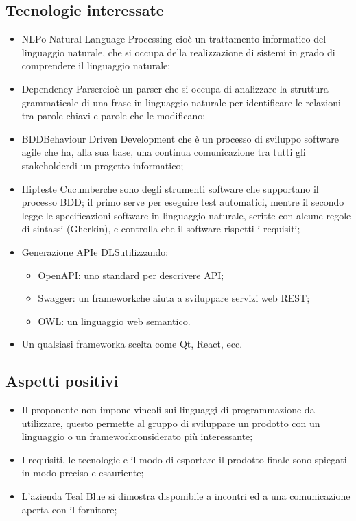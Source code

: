 \subsection{Tecnologie interessate}
\begin{itemize}
	\item NLP\glosp o Natural Language Processing cioè un trattamento informatico del linguaggio naturale, che si occupa della realizzazione di sistemi in grado di comprendere il linguaggio naturale;	
	\item Dependency Parser\glosp cioè un parser che si occupa di analizzare la struttura grammaticale di una frase in linguaggio naturale per identificare le relazioni tra parole chiavi e parole che le modificano;
	\item BDD\glosp Behaviour Driven Development che è un processo di sviluppo software agile che ha, alla sua base, una continua comunicazione tra tutti gli stakeholder\glosp di un progetto informatico;
	\item Hiptest\glosp e Cucumber\glosp che sono degli strumenti software che supportano il processo BDD\glo; il primo serve per eseguire test automatici, mentre il secondo legge le specificazioni software in linguaggio naturale, scritte con alcune regole di sintassi (Gherkin\glo), e controlla che il software rispetti i requisiti;
	\item Generazione API\glosp e DLS\glosp utilizzando:
	\begin{itemize}
		\item OpenAPI\glo: uno standard per descrivere API\glo;
		\item Swagger\glo: un framework\glosp che aiuta a sviluppare servizi web REST\glo;
		\item OWL\glo: un linguaggio web semantico.
	\end{itemize}
	\item Un qualsiasi framework\glosp a scelta come Qt\glo, React\glo, ecc.
\end{itemize} 
\subsection{Aspetti positivi}
\begin{itemize} 
	\item Il proponente non impone vincoli sui linguaggi di programmazione da utilizzare, questo permette  al gruppo di sviluppare un prodotto con un linguaggio o un framework\glosp considerato più interessante;
	\item I requisiti, le tecnologie e il modo di esportare il prodotto finale sono spiegati in modo preciso e esauriente;
	\item L'azienda Teal Blue si dimostra disponibile a incontri ed a una comunicazione aperta con il fornitore;
\end{itemize}
